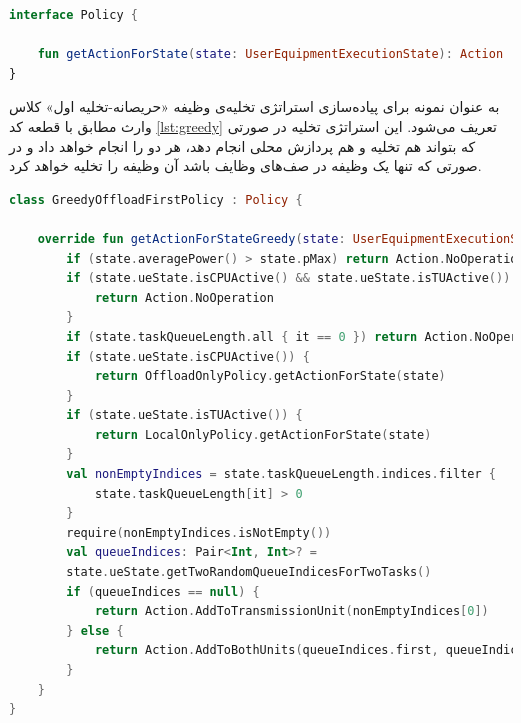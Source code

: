 \begin{LTR}
	\begin{lstlisting}[language=Kotlin, caption={واسط \lr{Policy}}, captiondirection=RTL, label={lst:policy}]
interface Policy {
	
	fun getActionForState(state: UserEquipmentExecutionState): Action
}
	\end{lstlisting}
\end{LTR}
به عنوان نمونه برای پیاده‌سازی استراتژی تخلیه‌ی وظیفه «حریصانه-تخلیه اول» کلاس وارث مطابق با قطعه کد \ref{lst:greedy} تعریف می‌شود. این استراتژی تخلیه در صورتی که بتواند هم تخلیه و هم پردازش محلی انجام دهد، هر دو را انجام خواهد داد و در صورتی که تنها یک وظیفه در صف‌های وظایف باشد آن وظیفه را تخلیه خواهد کرد.
\begin{LTR}
	\begin{lstlisting}[language=Kotlin, caption={پیاده‌سازی استراتژی تخلیه‌ی وظیفه حریصانه-تخلیه اول}, captiondirection=RTL, label={lst:greedy}]
class GreedyOffloadFirstPolicy : Policy {
	
	override fun getActionForStateGreedy(state: UserEquipmentExecutionState): Action {
		if (state.averagePower() > state.pMax) return Action.NoOperation
		if (state.ueState.isCPUActive() && state.ueState.isTUActive()) {
			return Action.NoOperation
		}
		if (state.taskQueueLength.all { it == 0 }) return Action.NoOperation
		if (state.ueState.isCPUActive()) {
			return OffloadOnlyPolicy.getActionForState(state)
		}
		if (state.ueState.isTUActive()) {
			return LocalOnlyPolicy.getActionForState(state)
		}
		val nonEmptyIndices = state.taskQueueLength.indices.filter {
			state.taskQueueLength[it] > 0
		}
		require(nonEmptyIndices.isNotEmpty())
		val queueIndices: Pair<Int, Int>? = 
		state.ueState.getTwoRandomQueueIndicesForTwoTasks()
		if (queueIndices == null) {
			return Action.AddToTransmissionUnit(nonEmptyIndices[0])
		} else {
			return Action.AddToBothUnits(queueIndices.first, queueIndices.second)
		}
	}
}
	\end{lstlisting}
\end{LTR}

